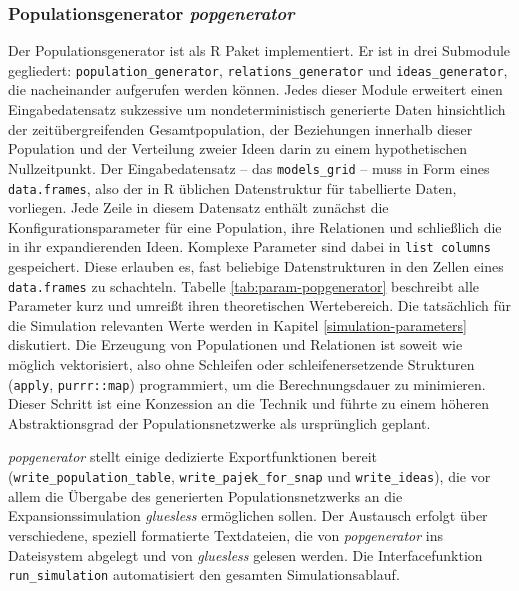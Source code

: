 \documentclass[openany,twoside,twocolumn]{book}
\begin{document}
\hypertarget{popgenerator}{%
\subsubsection{\texorpdfstring{Populationsgenerator \emph{popgenerator}}{Populationsgenerator popgenerator}}\label{popgenerator}}

Der Populationsgenerator ist als R Paket implementiert. Er ist in drei Submodule gegliedert: \texttt{population\_generator}, \texttt{relations\_generator} und \texttt{ideas\_generator}, die nacheinander aufgerufen werden können. Jedes dieser Module erweitert einen Eingabedatensatz sukzessive um nondeterministisch generierte Daten hinsichtlich der zeitübergreifenden Gesamtpopulation, der Beziehungen innerhalb dieser Population und der Verteilung zweier Ideen darin zu einem hypothetischen Nullzeitpunkt. Der Eingabedatensatz -- das \texttt{models\_grid} -- muss in Form eines \texttt{data.frames}, also der in R üblichen Datenstruktur für tabellierte Daten, vorliegen. Jede Zeile in diesem Datensatz enthält zunächst die Konfigurationsparameter für eine Population, ihre Relationen und schließlich die in ihr expandierenden Ideen. Komplexe Parameter sind dabei in \texttt{list\ columns} gespeichert. Diese erlauben es, fast beliebige Datenstrukturen in den Zellen eines \texttt{data.frames} zu schachteln. Tabelle \ref{tab:param-popgenerator} beschreibt alle Parameter kurz und umreißt ihren theoretischen Wertebereich. Die tatsächlich für die Simulation relevanten Werte werden in Kapitel \ref{simulation-parameters} diskutiert. Die Erzeugung von Populationen und Relationen ist soweit wie möglich vektorisiert, also ohne Schleifen oder schleifenersetzende Strukturen (\texttt{apply}, \texttt{purrr::map}) programmiert, um die Berechnungsdauer zu minimieren. Dieser Schritt ist eine Konzession an die Technik und führte zu einem höheren Abstraktionsgrad der Populationsnetzwerke als ursprünglich geplant.

\emph{popgenerator} stellt einige dedizierte Exportfunktionen bereit (\texttt{write\_population\_table}, \texttt{write\_pajek\_for\_snap} und \texttt{write\_ideas}), die vor allem die Übergabe des generierten Populationsnetzwerks an die Expansionssimulation \emph{gluesless} ermöglichen sollen. Der Austausch erfolgt über verschiedene, speziell formatierte Textdateien, die von \emph{popgenerator} ins Dateisystem abgelegt und von \emph{gluesless} gelesen werden. Die Interfacefunktion \texttt{run\_simulation} automatisiert den gesamten Simulationsablauf.
\end{document}
